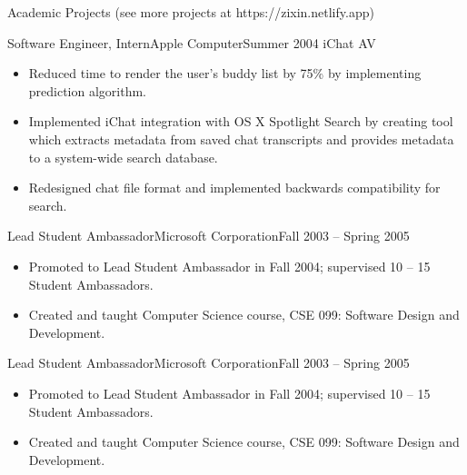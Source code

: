 \documentclass[]{mcdowellcv}
\begin{document}
	\begin{cvsection}{Academic Projects (see more projects at https://zixin.netlify.app)}
		\begin{cvsubsection}{Software Engineer, Intern}{Apple Computer}{Summer 2004}
			iChat AV			
			\begin{itemize}
				\item Reduced time to render the user’s buddy list by 75\% by implementing prediction algorithm.
				\item Implemented iChat integration with OS X Spotlight Search by creating tool which extracts metadata from saved chat transcripts and provides metadata to a system-wide search database.
				\item Redesigned chat file format and implemented backwards compatibility for search.
			\end{itemize}
		\end{cvsubsection}
		
		\begin{cvsubsection}{Lead Student Ambassador}{Microsoft Corporation}{Fall 2003 -- Spring 2005}	
			\begin{itemize}
				\item Promoted to Lead Student Ambassador in Fall 2004; supervised 10 -- 15 Student Ambassadors.
				\item Created and taught Computer Science course, CSE 099: Software Design and Development.
			\end{itemize}
		\end{cvsubsection}

		\begin{cvsubsection}{Lead Student Ambassador}{Microsoft Corporation}{Fall 2003 -- Spring 2005}	
			\begin{itemize}
				\item Promoted to Lead Student Ambassador in Fall 2004; supervised 10 -- 15 Student Ambassadors.
				\item Created and taught Computer Science course, CSE 099: Software Design and Development.
			\end{itemize}
		\end{cvsubsection}
	\end{cvsection}
	
\end{document}
